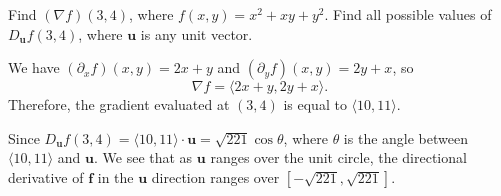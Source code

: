 \documentclass{watsonbook}
\begin{document}
  \begin{example}{}{}
    Find $(\nabla f)(3,4)$, where $f(x,y) = x^2 + xy + y^2$. Find all
    possible values of $D_{\mathbf{u}}f(3,4)$, where $\mathbf{u}$ is
    any unit vector. 
  \end{example}

  \begin{solution}
    We have $(\partial_xf)(x,y)= 2x + y$ and $(\partial_y f)(x,y) = 2y
    + x$, so
    \[
      \nabla f = \langle 2x + y, 2y + x \rangle. 
    \]
    Therefore, the gradient evaluated at $(3,4)$ is equal to
    $\boxed{\langle 10,11\rangle}$.

    Since  $D_{\mathbf{u}}f(3,4) = \langle 10,11\rangle \cdot
    \mathbf{u} = \sqrt{221}\cos\theta$, where $\theta$ is the angle
    between $\langle 10,11\rangle$ and $\mathbf{u}$. We see that as
    $\mathbf{u}$ ranges over the unit circle, the directional
    derivative of $\mathbf{f}$ in the $\mathbf{u}$ direction ranges
    over $\boxed{[-\sqrt{221}, \sqrt{221}]}$.  
  \end{solution}
\end{document}
